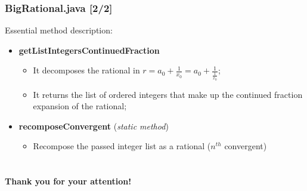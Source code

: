 \documentclass{beamer}
\begin{document}
    \begin{frame}
  \frametitle{BigRational.java [2/2]}
    Essential method description:
   
   \begin{itemize}
   \item \textbf{getListIntegersContinuedFraction}
   \begin{itemize}
   		\item It decomposes the rational in $r = a_0 + \frac{1}{x_0} = a_0 + \frac{1}{\frac{1}{x_0}}$;
   		\item It returns the list of ordered integers that make up the continued fraction expansion of the rational;
   \end{itemize}
   \item \textbf{recomposeConvergent} (\textit{static method})
   \begin{itemize}
   \item Recompose the passed integer list as a rational (${n}^{th}$ convergent)
   \end{itemize}
   \end{itemize}
    
  \end{frame}
  
  \section*{}
  
    \begin{frame}
    \begin{center}
           \textbf{Thank you for your attention!}
    \end{center}
  \end{frame}
\end{document}
